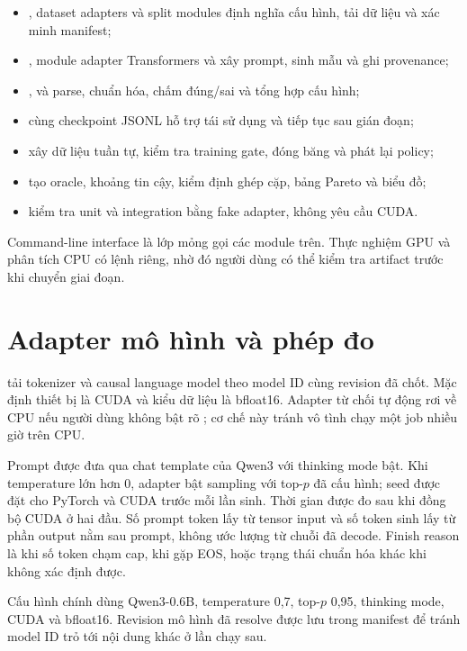 \begin{itemize}
  \item {}, dataset adapters và split modules định nghĩa cấu hình, tải
  dữ liệu và xác minh manifest;
  \item {}, module adapter Transformers và
   xây prompt, sinh mẫu và ghi provenance;
  \item {},  và  parse,
  chuẩn hóa, chấm đúng/sai và tổng hợp cấu hình;
  \item {} cùng checkpoint JSONL hỗ trợ tái sử dụng và
  tiếp tục sau gián đoạn;
  \item {} xây dữ liệu tuần tự, kiểm tra training gate, đóng băng và
  phát lại policy;
  \item {} tạo oracle, khoảng tin cậy, kiểm định ghép cặp, bảng Pareto
  và biểu đồ;
  \item {} kiểm tra unit và integration bằng fake adapter, không yêu cầu
  CUDA.
\end{itemize}

Command-line interface là lớp mỏng gọi các module trên. Thực nghiệm GPU và phân tích
CPU có lệnh riêng, nhờ đó người dùng có thể kiểm tra artifact trước khi chuyển giai
đoạn.

\section{Adapter mô hình và phép đo}

 tải tokenizer và causal language model theo model ID
cùng revision đã chốt. Mặc định thiết bị là CUDA và kiểu dữ liệu là bfloat16. Adapter
từ chối tự động rơi về CPU nếu người dùng không bật rõ ; cơ chế này
tránh vô tình chạy một job nhiều giờ trên CPU.

Prompt được đưa qua chat template của Qwen3 với thinking mode bật. Khi temperature
lớn hơn 0, adapter bật sampling với top-$p$ đã cấu hình; seed được đặt cho PyTorch và
CUDA trước mỗi lần sinh. Thời gian được đo sau khi đồng bộ CUDA ở hai đầu. Số prompt
token lấy từ tensor input và số token sinh lấy từ phần output nằm sau prompt, không
ước lượng từ chuỗi đã decode. Finish reason là  khi số token chạm cap,
 khi gặp EOS, hoặc trạng thái chuẩn hóa khác khi không xác định được.

Cấu hình chính dùng Qwen3-0.6B, temperature 0,7, top-$p$ 0,95, thinking mode, CUDA và
bfloat16. Revision mô hình đã resolve được lưu trong manifest để tránh model ID trỏ
tới nội dung khác ở lần chạy sau.

